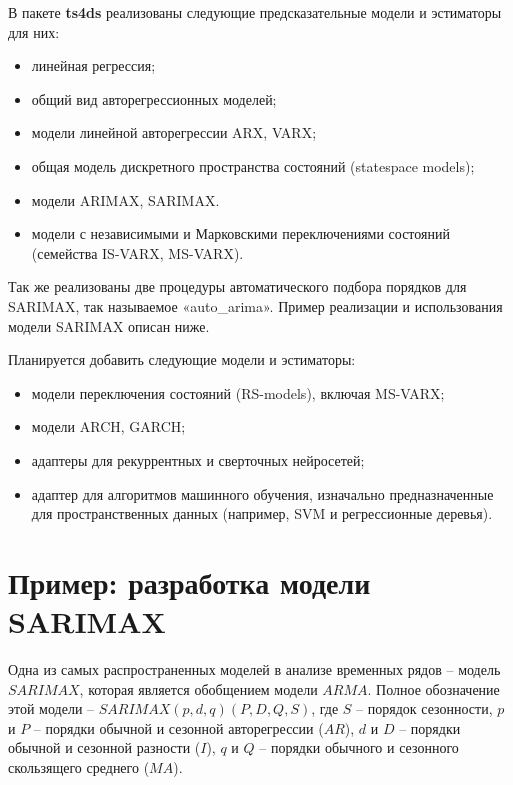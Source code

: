 \documentclass[../report.tex]{subfiles}
\begin{document}
	
	В пакете \textbf{ts4ds} реализованы следующие предсказательные модели и эстиматоры для них:
	\begin{itemize}
		\item линейная регрессия;
		\item общий вид авторегрессионных моделей;
		\item модели линейной авторегрессии ARX, VARX;
		\item общая модель дискретного пространства состояний (statespace models);
		\item модели ARIMAX, SARIMAX.
		\item модели с независимыми и Марковскими переключениями состояний (семейства IS-VARX, MS-VARX).
	\end{itemize}
	
	Так же реализованы две процедуры автоматического подбора порядков для SARIMAX, так называемое «auto\_arima»\cite{pyramid_arima}. Пример реализации и использования модели SARIMAX описан ниже.
	
	Планируется добавить следующие модели и эстиматоры:
	\begin{itemize}
		\item модели переключения состояний (RS-models), включая MS-VARX;
		\item модели ARCH, GARCH;
		\item адаптеры для рекуррентных и сверточных нейросетей;
		\item адаптер для алгоритмов машинного обучения, изначально предназначенные для пространственных данных (например, SVM и регрессионные деревья).
	\end{itemize}
	
	
	\section{Пример: разработка модели SARIMAX}
	
	Одна из самых распространенных моделей в анализе временных рядов – модель $SARIMAX$, которая является обобщением модели $ARMA$. Полное обозначение этой модели – $SARIMAX(p,d,q)(P,D,Q,S)$, где $S$ – порядок сезонности, $p$ и $P$ – порядки обычной и сезонной авторегрессии ($AR$), $d$ и $D$ – порядки обычной и сезонной разности ($I$), $q$ и $Q$ – порядки обычного и сезонного скользящего среднего ($MA$).
	
\end{document}
